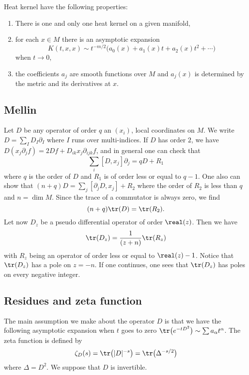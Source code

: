 \begin{theorem}
Heat kernel have the following properties:
\begin{enumerate}
\item There is one and only one heat kernel on a given manifold,
\item for each $x\in M$ there is an asymptotic expansion
\[
  K(t,x,x)\sim t^{-m/2}\big( a_0(x)+a_1(x)t+a_2(x)t^2+\cdots \big)
\]
when $t\to 0$,
\item the coefficients $a_j$ are smooth functions over $M$ and $a_j(x)$ is determined by the metric and its derivatives at $x$.
\end{enumerate}
\end{theorem}

\subsection{Mellin}


Let $D$ be any operator of order $q$ an $(x_i)$, local coordinates on $M$. We write $D=\sum_ID_I\partial_I$ where $I$ runs over multi-indices. If $D$ has order $2$, we have $D(x_j\partial_jf)=2Df+D_{ik}x_j\partial_{ijk}f$, and in general one can check that
\[
 \sum_i[D,x_j]\partial_j=qD+R_1
\]
where $q$ is the order of $D$ and $R_1$ is of order less or equal to $q-1$. One also can show that $(n+q)D=\sum_j[\partial_jD,x_j]+R_2$ where the order of $R_2$ is less than $q$ and $n=\dim M$. Since the trace of a commutator is always zero, we find
\begin{equation}
(n+q)\tr(D)=\tr(R_2).
\end{equation}
Let now $D_z$ be a pseudo differential operator of order $\real(z)$. Then we have
\[
  \tr(D_z)=\frac{1}{ (z+n) }\tr(R_z)
\]
with $R_z$ being an operator of order less or equal to $\real(z)-1$. Notice that $\tr(D_z)$ has a pole on $z=-n$. If one continues, one sees that $\tr(D_z)$ has poles on every negative integer.


\subsection{Residues and zeta function}

The main assumption we make about the operator $D$ is that we have the following asymptotic expansion when $t$ goes to zero $\tr\big( e^{-tD^2}\big)\sim \sum a_{\alpha}t^{\alpha}$. The zeta function is defined by
\begin{equation}
\zeta_D(s)=\tr\big( | D |^{-s} \big)=\tr\big( \Delta^{-s/2} \big)
\end{equation}
where $\Delta=D^2$. We suppose that $D$ is invertible.

